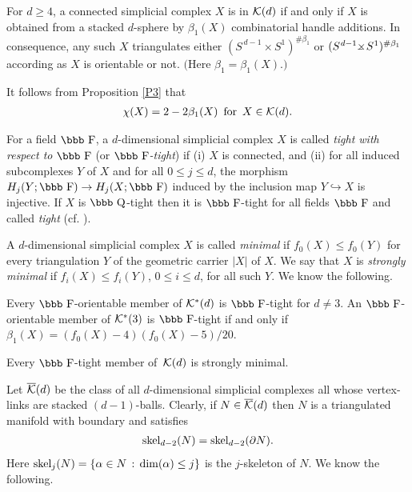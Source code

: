 \documentclass[11pt]{article}
\newcommand{\FF}{\mbox{\bbb F}} \newcommand{\HH}{\mbox{\bbb H}}
\newcommand{\QQ}{\mbox{\bbb Q}} \newcommand{\RR}{\mbox{\bbb R}}
\newcommand{\TPSSD}{S^{\hspace{.2mm}d-1} \mbox{$\times
\hspace{-2.8mm}_{-}$} \, S^{\hspace{.1mm}1}}
\begin{document}
\begin{prop}\label{P3} For $d\geq 4$, a connected
simplicial complex $X$ is in ${\cal K}(d)$ if and only if $X$ is
obtained from a stacked $d$-sphere by $\beta_1(X)$ combinatorial
handle additions. In consequence, any such $X$ triangulates either
$(S^{\,d -1}\!\times S^1)^{\# \beta_1}$ or $(\TPSSD)^{\#\beta_1}$
according as $X$ is orientable or not. $($Here $\beta_1 =
\beta_1(X).)$ \end{prop}

It follows from Proposition \ref{P3}  that \begin{eqnarray}
\label{eq:beta1} \chi(X) = 2 - 2 \beta_1(X) \, \mbox{ for } \,
X\in {\cal K}(d).  \end{eqnarray}

For a field $\FF$, a $d$-dimensional simplicial complex $X$ is
called {\em tight with respect to} $\FF$ (or {\em $\FF$-tight}) if
(i) $X$ is connected, and (ii) for all induced subcomplexes $Y$ of
$X$ and for all $0\leq j \leq d$, the morphism $H_{j}(Y; \FF) \to
H_{j}(X; \FF)$ induced by the inclusion map $Y \hookrightarrow X$
is injective. If $X$ is $\QQ$-tight then it is $\FF$-tight for all
fields $\FF$ and called {\em tight} (cf. \cite{bd17}).

A $d$-dimensional simplicial complex $X$ is called {\em minimal}
if $f_0(X) \leq f_0(Y)$ for every triangulation $Y$ of the
geometric carrier $|X|$ of $X$. We say that $X$ is {\em strongly
minimal} if $f_i(X) \leq f_i(Y)$, $0\leq i \leq d$, for all such
$Y$. We know the following.


\begin{prop}\label{P4} Every $\FF$-orientable member of ${\cal
K}^{\ast}(d)$ is $\FF$-tight for $d\neq 3$. An $\FF$-orientable
member of ${\cal K}^{\ast}(3)$ is $\FF$-tight if and only if
$\beta_1(X)=(f_0(X)-4)(f_0(X)-5)/20$.
\end{prop}

\begin{prop}\label{P5} Every
$\FF$-tight member of\,  ${\cal K}(d)$ is strongly minimal.
\end{prop}

Let $\overline{{\cal K}}(d)$ be the class of all $d$-dimensional
simplicial complexes all whose vertex-links are stacked
$(d-1)$-balls. Clearly, if $N \in \overline{{\cal K}}(d)$ then $N$
is a triangulated manifold with boundary and satisfies
\begin{eqnarray} \label{eq:skel} {\rm skel}_{d-2}(N) = {\rm
skel}_{d-2}(\partial N).  \end{eqnarray} Here ${\rm skel}_{j}(N) =
\{\alpha\in N \, : \, \dim(\alpha) \leq j\}$ is the $j$-skeleton
of $N$. We know the following.
\end{document}
